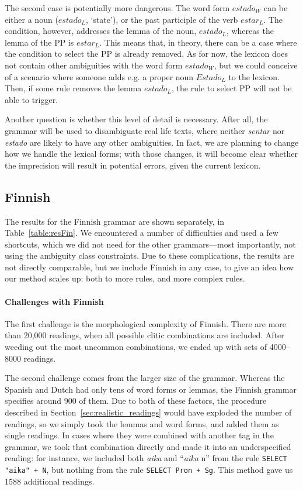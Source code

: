 {{The second case is potentially more dangerous. 
The word form $estado_{W}$ 
can be either a noun ($estado_{L}$, `state'), or the past participle of the verb $estar_{L}$. 
The condition, however, addresses the lemma of the noun, $estado_L$, whereas the lemma of the PP is $estar_{L}$.
This means that, in theory, there can be a case where the condition to select the PP is already removed. As for now, the lexicon does not contain other ambiguities with the word form $estado_{W}$, but we could conceive of a scenario where someone adds e.g. a proper noun $Estado_{L}$ to the lexicon. Then, if some rule removes the lemma $estado_{L}$, the rule to select PP will not be able to trigger.


Another question is whether this level of detail is necessary. 
After all, the grammar will be used to disambiguate real life texts, where neither \emph{sentar} nor \emph{estado} are likely to have any other ambiguities.
In fact, we are planning to change how we handle the lexical forms; with those changes, it will become clear whether the imprecision will result in potential errors, given the current lexicon. 



\subsection{Finnish} 
\label{sec:finnishEval}

The results for the Finnish grammar are shown separately, in Table~\ref{table:resFin}. We encountered a number of difficulties and used a few shortcuts, which we did not need for the other grammars---most importantly, not using the ambiguity class constraints. Due to these complications, the results are not directly comparable, but we include Finnish in any case, 
to give an idea how our method scales up: both to more rules, and more complex rules.

\paragraph{Challenges with Finnish} The first challenge is the morphological complexity of Finnish.
There are more than 20,000 readings, when all possible clitic combinations are included.
After weeding out the most uncommon combinations, we ended up with sets of 4000--8000 readings.

The second challenge comes from the larger size of the grammar. Whereas the Spanish and Dutch had only tens of word forms or lemmas, the Finnish grammar specifies around 900 of them.
Due to both of these factors, the procedure described in Section~\ref{sec:realistic_readings} would have exploded the number of readings, so we simply took the lemmas and word forms, and added them as single readings. 
In cases where they were combined with another tag in the grammar, we took that combination directly and made it into an underspecified reading: for instance, we included both \emph{aika} and ``\emph{aika} n'' from the rule \texttt{SELECT "aika" + N},
but nothing from the rule \texttt{SELECT Pron + Sg}. This method gave us 1588 additional readings.

}}
